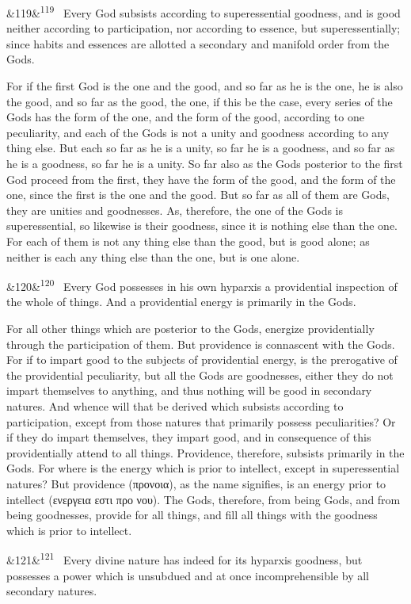 \documentclass[12pt]{article}
\newcommand{\para}[1][]{\par\noindent\ifx&#1&\else\textsuperscript{\footnotesize #1}~\fi}
\begin{document}
\para[119] Every God subsists according to superessential goodness, and is good neither according to participation, nor according to essence, but superessentially; since habits and essences are allotted a secondary and manifold order from the Gods.

For if the first God is the one and the good, and so far as he is the one, he is also the good, and so far as the good, the one, if this be the case, every series of the Gods has the form of the one, and the form of the good, according to one peculiarity, and each of the Gods is not a unity and goodness according to any thing else. But each so far as he is a unity, so far he is a goodness, and so far as he is a goodness, so far he is a unity. So far also as the Gods posterior to the first God proceed from the first, they have the form of the good, and the form of the one, since the first is the one and the good. But so far as all of them are Gods, they are unities and goodnesses. As, therefore, the one of the Gods is superessential, so likewise is their goodness, since it is nothing else than the one. For each of them is not any thing else than the good, but is good alone; as neither is each any thing else than the one, but is one alone.

\para[120] Every God possesses in his own hyparxis a providential inspection of the whole of things. And a providential energy is primarily in the Gods.

For all other things which are posterior to the Gods, energize providentially through the participation of them. But providence is connascent with the Gods. For if to impart good to the subjects of providential energy, is the prerogative of the providential peculiarity, but all the Gods are goodnesses, either they do not impart themselves to anything, and thus nothing will be good in secondary natures. And whence will that be derived which subsists according to participation, except from those natures that primarily possess peculiarities? Or if they do impart themselves, they impart good, and in consequence of this providentially attend to all things. Providence, therefore, subsists primarily in the Gods. For where is the energy which is prior to intellect, except in superessential natures? But providence (προνοια), as the name signifies, is an energy prior to intellect (ενεργεια εστι προ νου). The Gods, therefore, from being Gods, and from being goodnesses, provide for all things, and fill all things with the goodness which is prior to intellect.

\para[121] Every divine nature has indeed for its hyparxis goodness, but possesses a power which is unsubdued and at once incomprehensible by all secondary natures.
\end{document}
